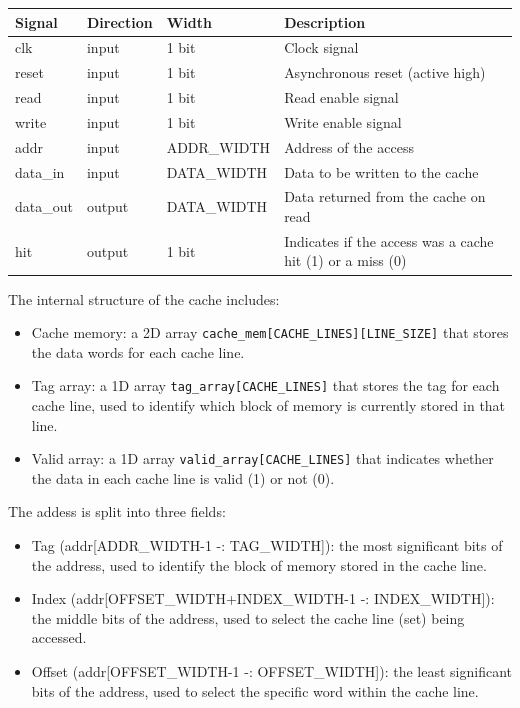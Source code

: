 \documentclass{article}
\begin{document}
\begin{table}[H]
\centering
    \begin{tabular}{|l|l|l|p{8cm}|}
    \hline
    \textbf{Signal} & \textbf{Direction} & \textbf{Width} & \textbf{Description} \\
    \hline
    clk & input & 1 bit & Clock signal \\
    reset & input & 1 bit & Asynchronous reset (active high) \\
    read & input & 1 bit & Read enable signal \\
    write & input & 1 bit & Write enable signal \\
    addr & input & ADDR\_WIDTH & Address of the access \\
    data\_in & input & DATA\_WIDTH & Data to be written to the cache \\
    data\_out & output & DATA\_WIDTH & Data returned from the cache on read \\
    hit & output & 1 bit & Indicates if the access was a cache hit (1) or a miss (0) \\
    \hline
    \end{tabular}
\end{table}


The internal structure of the cache includes: 
\begin{itemize}
  \item Cache memory: a 2D array \texttt{cache\_mem[CACHE\_LINES][LINE\_SIZE]} that stores the data words for each cache line.
  \item Tag array: a 1D array \texttt{tag\_array[CACHE\_LINES]} that stores the tag for each cache line, used to identify which block of memory is currently stored in that line.
  \item Valid array: a 1D array \texttt{valid\_array[CACHE\_LINES]} that indicates whether the data in each cache line is valid (1) or not (0).
\end{itemize}

The addess is split into three fields:
\begin{itemize}
  \item Tag (addr[ADDR\_WIDTH-1 -: TAG\_WIDTH]): the most significant bits of the address, used to identify the block of memory stored in the cache line.
  \item Index (addr[OFFSET\_WIDTH+INDEX\_WIDTH-1 -: INDEX\_WIDTH]): the middle bits of the address, used to select the cache line (set) being accessed.
  \item Offset (addr[OFFSET\_WIDTH-1 -: OFFSET\_WIDTH]): the least significant bits of the address, used to select the specific word within the cache line.
\end{itemize}
\end{document}
